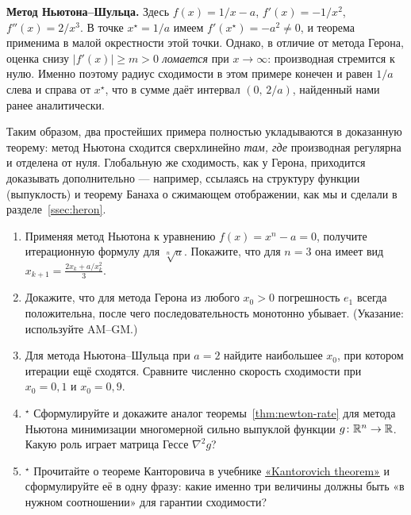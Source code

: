 \textbf{Метод Ньютона--Шульца.} Здесь $f(x)=1/x-a$, $f'(x)=-1/x^{2}$,
$f''(x)=2/x^{3}$. В точке $x^{\star}=1/a$ имеем $f'(x^{\star})=-a^{2}\neq 0$,
и теорема применима в малой окрестности этой точки. Однако, в
отличие от метода Герона, оценка снизу $|f'(x)|\geq m>0$ \emph{ломается}
при $x\to\infty$: производная стремится к нулю. Именно поэтому
радиус сходимости в этом примере конечен и равен $1/a$ слева и справа
от $x^{\star}$, что в сумме даёт интервал $(0,\,2/a)$, найденный нами
ранее аналитически.

\medskip

Таким образом, два простейших примера полностью укладываются в
доказанную теорему: метод Ньютона сходится сверхлинейно \emph{там,
где} производная регулярна и отделена от нуля. Глобальную же
сходимость, как у Герона, приходится доказывать дополнительно — например,
ссылаясь на структуру функции (выпуклость) и теорему Банаха о
сжимающем отображении, как мы и сделали в разделе~\ref{ssec:heron}.

\begin{tasksbox}
\begin{enumerate}\itemsep1pt
  \item Применяя метод Ньютона к уравнению $f(x)=x^{n}-a=0$, получите
        итерационную формулу для $\sqrt[n]{a}$. Покажите, что для $n=3$
        она имеет вид $x_{k+1}=\frac{2 x_k+a/x_k^{2}}{3}$.
  \item Докажите, что для метода Герона из любого $x_0>0$ погрешность
        $e_1$ всегда положительна, после чего последовательность
        монотонно убывает. (Указание: используйте AM--GM.)
  \item Для метода Ньютона--Шульца при $a=2$ найдите наибольшее $x_0$,
        при котором итерации ещё сходятся. Сравните численно скорость
        сходимости при $x_0=0{,}1$ и $x_0=0{,}9$.
  \item$^{\star}$ Сформулируйте и докажите аналог
        теоремы~\ref{thm:newton-rate} для метода Ньютона минимизации
        многомерной сильно выпуклой функции $g\colon\mathbb{R}^{n}\to\mathbb{R}$.
        Какую роль играет матрица Гессе $\nabla^{2}g$?
  \item$^{\star}$ Прочитайте о теореме Канторовича в учебнике
        \href{https://en.wikipedia.org/wiki/Kantorovich_theorem}{«Kantorovich theorem»}
        и сформулируйте её в одну фразу: какие именно три величины
        должны быть «в нужном соотношении» для гарантии сходимости?
\end{enumerate}
\end{tasksbox}
